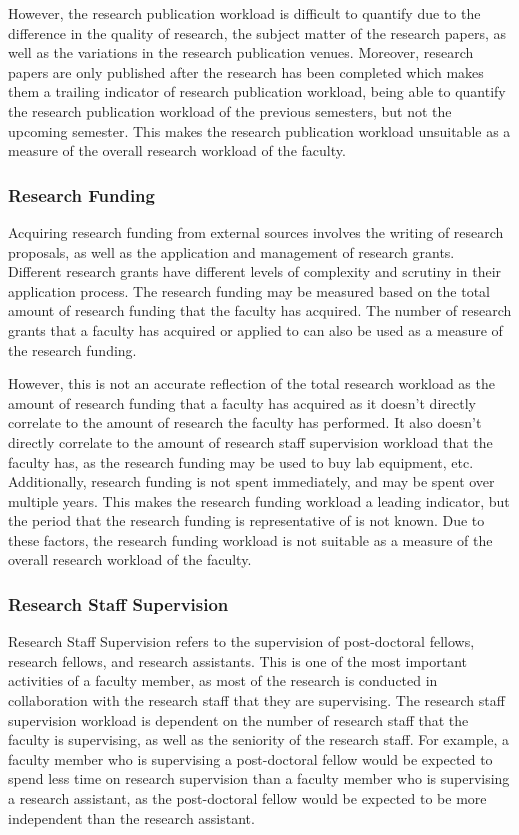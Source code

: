 However, the research publication workload is difficult to quantify due to the difference in the quality of research, the subject matter of the research papers, as well as the variations in the research publication venues. Moreover, research papers are only published after the research has been completed which makes them a trailing indicator of research publication workload, being able to quantify the research publication workload of the previous semesters, but not the upcoming semester. This makes the research publication workload unsuitable as a measure of the overall research workload of the faculty.

\subsubsection{Research Funding}

Acquiring research funding from external sources involves the writing of research proposals, as well as the application and management of research grants. Different research grants have different levels of complexity and scrutiny in their application process. The research funding may be measured based on the total amount of research funding that the faculty has acquired. The number of research grants that a faculty has acquired or applied to can also be used as a measure of the research funding.

However, this is not an accurate reflection of the total research workload as the amount of research funding that a faculty has acquired as it doesn't directly correlate to the amount of research the faculty has performed. It also doesn't directly correlate to the amount of research staff supervision workload that the faculty has, as the research funding may be used to buy lab equipment, etc. Additionally, research funding is not spent immediately, and may be spent over multiple years. This makes the research funding workload a leading indicator, but the period that the research funding is representative of is not known. Due to these factors, the research funding workload is not suitable as a measure of the overall research workload of the faculty.

\subsubsection{Research Staff Supervision}

Research Staff Supervision refers to the supervision of post-doctoral fellows, research fellows, and research assistants. This is one of the most important activities of a faculty member, as most of the research is conducted in collaboration with the research staff that they are supervising. The research staff supervision workload is dependent on the number of research staff that the faculty is supervising, as well as the seniority of the research staff. For example, a faculty member who is supervising a post-doctoral fellow would be expected to spend less time on research supervision than a faculty member who is supervising a research assistant, as the post-doctoral fellow would be expected to be more independent than the research assistant.

